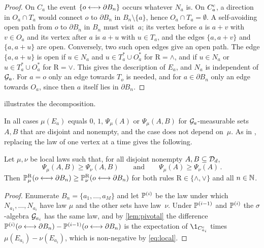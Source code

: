 \documentclass[11pt,letterpaper]{article}
\begin{document}
\begin{proof}
On $C_a$ the event $\{o\lra\partial B_n\}$ occurs whatever $N_a$ is. On $C_a^\c$, a direction in $O_a\cap T_a$ would connect $o$ to $\partial B_n$ in $B_n\setminus\{a\}$, hence $O_a\cap T_a=\emptyset$. A self-avoiding open path from $o$ to $\partial B_n$ in $B_n$ must visit~$a$; its vertex before $a$ is $a+v$ with $v\in O_a$ and its vertex after $a$ is $a+u$ with $u\in T_a$, and the edges $\{a,a+v\}$ and $\{a,a+u\}$ are open. Conversely, two such open edges give an open path. The edge $\{a,a+u\}$ is open if $u\in N_a$ and $u\in T_a^*\cup O_a^*$ for $\mathrm R=\wedge$, and if $u\in N_a$ or $u\in T_a^*\cup O_a^*$ for $\mathrm R=\vee$. This gives the description of $E_a$, and $N_a$ is independent of $\cG_a$. For $a=o$ only an edge towards $T_o$ is needed, and for $a\in\partial B_n$ only an edge towards $O_a$, since then $a$ itself lies in $\partial B_n$.
\end{proof}

 illustrates the decomposition.



In all cases $\mu(E_a)$ equals $0$, $1$, $\Psi_\mu(A)$ or $\Psi_\mu(A,B)$ for $\cG_a$-measurable sets $A,B$ that are disjoint and nonempty, and the case does not depend on~$\mu$. As in \cite[Theorem~3.9]{BJKLRT25}, replacing the law of one vertex at a time gives the following.

\begin{proposition}\label{prop:l2g}
Let $\mu,\nu$ be local laws such that, for all disjoint nonempty $A,B\subseteq\cD_d$,
\begin{equation}\label{eq:local}
\Psi_\mu(A,B)\ge\Psi_\nu(A,B)\qquad\text{and}\qquad\Psi_\mu(A)\ge\Psi_\nu(A)\,.
\end{equation}
Then $\P^{\mathrm R}_\mu(o\lra\partial B_n)\ge\P^{\mathrm R}_\nu(o\lra\partial B_n)$ for both rules $\mathrm R\in\{\wedge,\vee\}$ and all $n\in\N$.
\end{proposition}

\begin{proof}
Enumerate $B_n=\{a_1,\dots,a_M\}$ and let $\P^{(i)}$ be the law under which $N_{a_1},\dots,N_{a_i}$ have law $\mu$ and the other sets have law~$\nu$. Under $\P^{(i-1)}$ and $\P^{(i)}$ the $\sigma$-algebra $\cG_{a_i}$ has the same law, and by \cref{lem:pivotal} the difference $\P^{(i)}(o\lra\partial B_n)-\P^{(i-1)}(o\lra\partial B_n)$ is the expectation of $\1_{C_{a_i}^\c}$ times $\mu(E_{a_i})-\nu(E_{a_i})$, which is non-negative by \eqref{eq:local}.
\end{proof}
\end{document}
